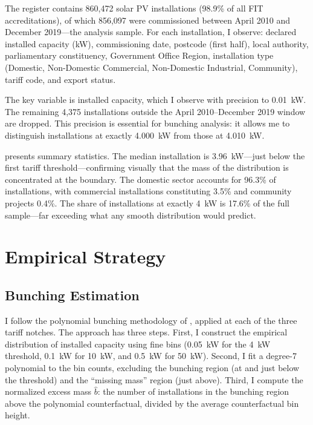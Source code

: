\documentclass[12pt]{article}
\begin{document}
The register contains 860,472 solar PV installations (98.9\% of all FIT accreditations), of which 856,097 were commissioned between April 2010 and December 2019---the analysis sample. For each installation, I observe: declared installed capacity (kW), commissioning date, postcode (first half), local authority, parliamentary constituency, Government Office Region, installation type (Domestic, Non-Domestic Commercial, Non-Domestic Industrial, Community), tariff code, and export status.

The key variable is installed capacity, which I observe with precision to 0.01~kW. The remaining 4,375 installations outside the April 2010--December 2019 window are dropped. This precision is essential for bunching analysis: it allows me to distinguish installations at exactly 4.000~kW from those at 4.010~kW.



 presents summary statistics. The median installation is 3.96~kW---just below the first tariff threshold---confirming visually that the mass of the distribution is concentrated at the boundary. The domestic sector accounts for 96.3\% of installations, with commercial installations constituting 3.5\% and community projects 0.4\%. The share of installations at exactly 4~kW is 17.6\% of the full sample---far exceeding what any smooth distribution would predict.


\section{Empirical Strategy}
\label{sec:strategy}

\subsection{Bunching Estimation}

I follow the polynomial bunching methodology of \citet{kleven2013}, applied at each of the three tariff notches. The approach has three steps. First, I construct the empirical distribution of installed capacity using fine bins (0.05~kW for the 4~kW threshold, 0.1~kW for 10~kW, and 0.5~kW for 50~kW). Second, I fit a degree-7 polynomial to the bin counts, excluding the bunching region (at and just below the threshold) and the ``missing mass'' region (just above). Third, I compute the normalized excess mass $\hat{b}$: the number of installations in the bunching region above the polynomial counterfactual, divided by the average counterfactual bin height.
\end{document}
